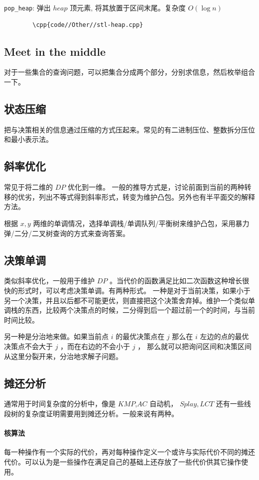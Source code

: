 \documentclass[UTF-8]{ctexart}
\newcommand{\cpp}[1]{\inputminted[bgcolor=bg,breaklines,breakanywhere=true]{c++}{#1}}
\begin{document}
		\texttt{pop\_heap}: 弹出 $heap$ 顶元素, 将其放置于区间末尾。复杂度 $O(\log n)$
		
		\begin{verbatim}
		\cpp{code//Other//stl-heap.cpp}
		\end{verbatim}

		\subsection{Meet in the middle}
		对于一些集合的查询问题，可以把集合分成两个部分，分别求信息，然后枚举组合一下。
		\subsection{状态压缩}
		把与决策相关的信息通过压缩的方式压起来。常见的有二进制压位、整数拆分压位和最小表示法。
		\subsection{斜率优化}
		常见于将二维的 $DP$ 优化到一维。
		一般的推导方式是，讨论前面到当前的两种转移的优劣，列出不等式得到斜率形式，转变为维护凸包。另外也有半平面交的解释方法。
		
		根据 $x,y$ 两维的单调情况，选择单调栈/单调队列/平衡树来维护凸包，采用暴力弹/二分/二叉树查询的方式来查询答案。
		\subsection{决策单调}
		类似斜率优化，一般用于维护 $DP$ 。当代价的函数满足比如二次函数这种增长很快的形式时，可以考虑决策单调。有两种形式。
		一种是对于当前决策，如果小于另一个决策，并且以后都不可能更优，则直接把这个决策舍弃掉。维护一个类似单调栈的东西，比较两个决策点的时候，二分得到后一个超过前一个的时间，与当前时间比较。
		
		另一种是分治地来做。如果当前点 $i$ 的最优决策点在 $j$ 那么在 $i$ 左边的点的最优决策点不会大于 $j$ ，而在右边的不会小于 $j$ ， 那么就可以把询问区间和决策区间从这里分裂开来，分治地求解子问题。
		\subsection{摊还分析}
		通常用于时间复杂度的分析中，像是 $KMP$,$AC$ 自动机， $Splay,LCT$ 还有一些线段树的复杂度证明需要用到摊还分析。一般来说有两种。
		\paragraph{核算法} 每一种操作有一个实际的代价，再对每种操作定义一个或许与实际代价不同的摊还代价。可以认为是一些操作在满足自己的基础上还存放了一些代价供其它操作使用。
\end{document}
